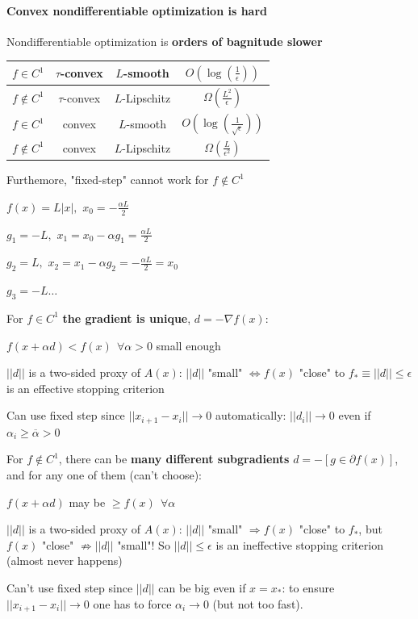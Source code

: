 \documentclass[10pt]{report}
\begin{document}
\paragraph{Convex nondifferentiable optimization is hard} Nondifferentiable optimization is \textbf{orders of bagnitude slower}
\begin{center}
	\begin{tabular}{c | c | c | c}
	$f\in C^1$&$\tau$-convex&$L$-smooth&$O\left(\log\left(\frac{1}{\epsilon}\right)\right)$\\
	\hline
	$f\not\in C^1$&$\tau$-convex&$L$-Lipschitz&$\Omega\left(\frac{L^2}{\epsilon}\right)$\\
	\hline
	$f\in C^1$&convex&$L$-smooth&$O\left(\log\left(\frac{1}{\sqrt{\epsilon}}\right)\right)$\\
	\hline
	$f\not\in C^1$&convex&$L$-Lipschitz&$\Omega\left(\frac{L}{\epsilon^2}\right)$
	\end{tabular}
\end{center}
Furthemore, "fixed-step" cannot work for $f\not\in C^1$
\begin{list}{}{}
	\item $f(x) = L|x|,$ $x_0 =-\frac{\alpha L}{2}$
	\item $g_1 = -L,$ $x_1 = x_0 - \alpha g_1 = \frac{\alpha L}{2}$
	\item $g_2 = L,$ $x_2 = x_1 - \alpha g_2 = -\frac{\alpha L}{2} = x_0$
	\item $g_3 = -L\ldots$
\end{list}
For $f\in C^1$ \textbf{the gradient is unique}, $d=-\nabla f(x)$:
\begin{list}{}{}
	\item $f(x+\alpha d) < f(x)\:\:\forall\alpha > 0$ small enough
	\item $||d||$ is a two-sided proxy of $A(x)$: $||d||$ "small" $\Leftrightarrow f(x)$ "close" to $f_*\equiv ||d||\leq \epsilon$ is an effective stopping criterion
	\item Can use fixed step since $||x_{i+1}-x_i||\rightarrow 0$ automatically: $||d_i||\rightarrow 0$ even if $\alpha_i \geq \overline{\alpha} > 0$
\end{list}
For $f\not\in C^1$, there can be \textbf{many different subgradients} $d = -[g\in\partial f(x)]$, and for any one of them (can't choose):
\begin{list}{}{}
	\item $f(x+\alpha d)$ may be $\geq f(x)\:\:\forall\alpha$
	\item $||d||$ is a two-sided proxy of $A(x)$: $||d||$ "small" $\Rightarrow f(x)$ "close" to $f_*$, but $f(x)$ "close" $\not\Rightarrow ||d||$ "small"! So $||d||\leq \epsilon$ is an ineffective stopping criterion (almost never happens)
	\item Can't use fixed step since $||d||$ can be big even if $x = x_*$: to ensure $||x_{i+1}-x_i||\rightarrow 0$ one has to force $\alpha_i\rightarrow 0$ (but not too fast).
\end{list}
\end{document}
